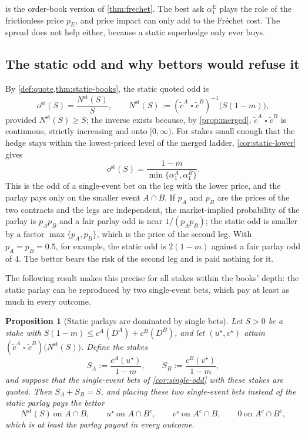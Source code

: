 \documentclass[11pt,a4paper]{article}
\theoremstyle{plain}
\newtheorem{proposition}[theorem]{Proposition}
\theoremstyle{definition}
\theoremstyle{remark}
\newcommand{\1}{\mathbf{1}}
\newcommand{\infconv}{\mathbin{\square}}
\begin{document}
 is the order-book version of \cref{thm:frechet}. The best ask $\alpha^E_1$ plays the role of the frictionless price $p_E$, and price impact can only add to the Fréchet cost. The spread does not help either, because a static superhedge only ever buys.

\subsection{The static odd and why bettors would refuse it}

By \cref{def:quote,thm:static-books}, the static quoted odd is
\[
o^{\mathrm{st}}(S) = \frac{N^{\mathrm{st}}(S)}{S},\qquad N^{\mathrm{st}}(S) := (\tilde c^A\infconv\tilde c^B)^{-1}\bigl(S(1-m)\bigr),
\]
provided $N^{\mathrm{st}}(S)\geq S$; the inverse exists because, by \cref{prop:merged}, $\tilde c^A\infconv\tilde c^B$ is continuous, strictly increasing and onto $[0,\infty)$. For stakes small enough that the hedge stays within the lowest-priced level of the merged ladder, \cref{cor:static-lower} gives
\[
o^{\mathrm{st}}(S) = \frac{1-m}{\min\{\alpha^A_1,\alpha^B_1\}}.
\]
This is the odd of a single-event bet on the leg with the lower price, and the parlay pays only on the smaller event $A\cap B$. If $p_A$ and $p_B$ are the prices of the two contracts and the legs are independent, the market-implied probability of the parlay is $p_Ap_B$ and a fair parlay odd is near $1/(p_Ap_B)$; the static odd is smaller by a factor $\max\{p_A,p_B\}$, which is the price of the second leg. With $p_A = p_B = 0.5$, for example, the static odd is $2(1-m)$ against a fair parlay odd of $4$. The bettor bears the risk of the second leg and is paid nothing for it.

The following result makes this precise for all stakes within the books' depth: the static parlay can be reproduced by two single-event bets, which pay at least as much in every outcome.

\begin{proposition}[Static parlays are dominated by single bets]
\label{prop:dominated}
Let $S>0$ be a stake with $S(1-m)\leq c^A(D^A)+c^B(D^B)$, and let $(u^\star,v^\star)$ attain $(\tilde c^A\infconv\tilde c^B)\bigl(N^{\mathrm{st}}(S)\bigr)$. Define the stakes
\[
S_A := \frac{c^A(u^\star)}{1-m},\qquad S_B := \frac{c^B(v^\star)}{1-m},
\]
and suppose that the single-event bets of \cref{cor:single-odd} with these stakes are quoted. Then $S_A+S_B = S$, and placing these two single-event bets instead of the static parlay pays the bettor
\[
N^{\mathrm{st}}(S)\ \text{on } A\cap B,\qquad u^\star\ \text{on } A\cap B^c,\qquad v^\star\ \text{on } A^c\cap B,\qquad 0\ \text{on } A^c\cap B^c,
\]
which is at least the parlay payout in every outcome.
\end{proposition}
\end{document}
